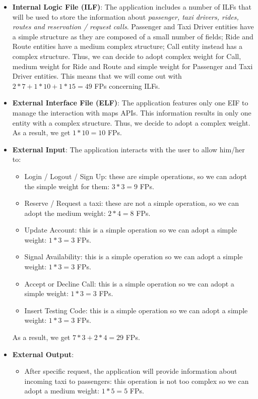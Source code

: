 \begin{itemize}
	\item \textbf{Internal Logic File (ILF)}: The application includes a number of ILFs that will be used to store the information about \textit{passenger, taxi drivers, rides, routes and reservation / request calls}. Passenger and Taxi Driver entities have a simple structure as they are composed of a small number of fields; Ride and Route entities have a medium complex structure; Call entity instead has a complex structure. Thus, we can decide to adopt complex weight for Call, medium weight for Ride and Route and simple weight for Passenger and Taxi Driver entities. This means that we will come out with $2*7 + 1*10 + 1*15 = 49$ FPs concerning ILFs.
	\item \textbf{External Interface File (ELF)}: The application features only one EIF to manage the interaction with maps APIs. This information results in only one entity with a complex structure. Thus, we decide to adopt a complex weight. As a result, we get $1*10 = 10$ FPs.
	\item \textbf{External Input}: The application interacts with the user to allow him/her to:
	\begin{itemize}
		\item Login / Logout / Sign Up: these are simple operations, so we can adopt the simple weight for them: $3*3 = 9$ FPs.
		\item Reserve / Request a taxi: these are not a simple operation, so we can adopt the medium weight: $2*4 = 8$ FPs.
		\item Update Account: this is a simple operation so we can adopt a simple weight: $1*3 = 3$ FPs.
		\item Signal Availability: this is a simple operation so we can adopt a simple weight: $1*3 = 3$ FPs.
		\item Accept or Decline Call: this is a simple operation so we can adopt a simple weight: $1*3 = 3$ FPs.
		\item Insert Testing Code: this is a simple operation so we can adopt a simple weight: $1*3 = 3$ FPs.
	\end{itemize}
	As a result, we get $7*3 + 2*4 = 29$ FPs.
	\item \textbf{External Output}:
	\begin{itemize}
		\item After specific request, the application will provide information about incoming taxi to passengers: this operation is not too complex so we can adopt a medium weight: $1*5 = 5$ FPs.

\end{itemize}
\end{itemize}
